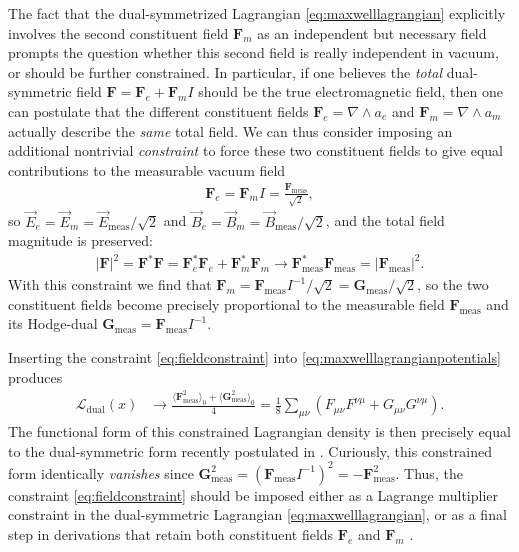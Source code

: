 \documentclass[1p,sort&compress]{elsarticle}
\numberwithin{equation}{section}
\newcommand{\rv}[1]{\vec{#1}}
\newcommand{\bv}[1]{\mathbf{#1}}
\newcommand{\mean}[1]{\langle #1 \rangle}
\begin{document}
The fact that the dual-symmetrized Lagrangian \eqref{eq:maxwelllagrangian} explicitly involves the second constituent field $\bv{F}_m$ as an independent but necessary field prompts the question whether this second field is really independent in vacuum, or should be further constrained.  In particular, if one believes the \emph{total} dual-symmetric field $\bv{F} = \bv{F}_e + \bv{F}_m I$ should be the true electromagnetic field, then one can postulate that the different constituent fields $\bv{F}_e = \nabla \wedge a_e$ and $\bv{F}_m = \nabla \wedge a_m$ actually describe the \emph{same} total field.  We can thus consider imposing an additional nontrivial \emph{constraint} to force these two constituent fields to give equal contributions to the measurable vacuum field
\begin{align}\label{eq:fieldconstraint}
  \bv{F}_e = \bv{F}_m I = \frac{\bv{F}_{\text{meas}}}{\sqrt{2}},
\end{align}
so $\rv{E}_e = \rv{E}_m = \rv{E}_{\text{meas}}/\sqrt{2}$ and $\rv{B}_e = \rv{B}_m = \rv{B}_{\text{meas}}/\sqrt{2}$, and the total field magnitude is preserved:
\begin{align}
  |\bv{F}|^2 = \bv{F}^*\bv{F} = \bv{F}_e^*\bv{F}_e + \bv{F}_m^*\bv{F}_m \to \bv{F}^*_{\text{meas}}\bv{F}_{\text{meas}} = |\bv{F}_{\text{meas}}|^2.
\end{align}
With this constraint we find that $\bv{F}_m = \bv{F}_{\text{meas}} I^{-1}/\sqrt{2} = \bv{G}_{\text{meas}}/\sqrt{2}$, so the two constituent fields become precisely proportional to the measurable field $\bv{F}_{\text{meas}}$ and its Hodge-dual $\bv{G}_{\text{meas}} = \bv{F}_{\text{meas}} I^{-1}$.  

Inserting the constraint \eqref{eq:fieldconstraint} into \eqref{eq:maxwelllagrangianpotentials} produces 
\begin{align}\label{eq:lagrangianvanishing}
  \mathcal{L}_{\text{dual}}(x) &\to \frac{\mean{\bv{F}_{\text{meas}}^2}_0 + \mean{\bv{G}_{\text{meas}}^2}_0}{4} = \frac{1}{8}\sum_{\mu\nu}(F_{\mu\nu}F^{\nu\mu} + G_{\mu\nu}G^{\nu\mu}).
\end{align}
The functional form of this constrained Lagrangian density is then precisely equal to the dual-symmetric form recently postulated in \cite{Bliokh2013,Cameron2012}.  Curiously, this constrained form identically \emph{vanishes} since $\bv{G}_{\text{meas}}^2 = (\bv{F}_{\text{meas}}I^{-1})^2 = -\bv{F}_{\text{meas}}^2$. Thus, the constraint \eqref{eq:fieldconstraint} should be imposed either as a Lagrange multiplier constraint in the dual-symmetric Lagrangian \eqref{eq:maxwelllagrangian}, or as a final step in derivations that retain both constituent fields $\bv{F}_e$ and $\bv{F}_m$ \cite{Bliokh2013,Cameron2012}.  
\end{document}
